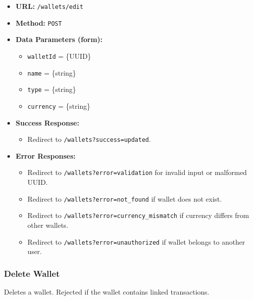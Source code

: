 \begin{itemize}
    \item \textbf{URL:} \texttt{/wallets/edit}
    \item \textbf{Method:} \texttt{POST}
    \item \textbf{Data Parameters (form):}
    \begin{itemize}
        \item \texttt{walletId} = \{UUID\}
        \item \texttt{name} = \{string\}
        \item \texttt{type} = \{string\}
        \item \texttt{currency} = \{string\}
    \end{itemize}
    \item \textbf{Success Response:}
    \begin{itemize}
        \item Redirect to \texttt{/wallets?success=updated}.
    \end{itemize}
    \item \textbf{Error Responses:}
    \begin{itemize}
        \item Redirect to \texttt{/wallets?error=validation} for invalid input or malformed UUID.
        \item Redirect to \texttt{/wallets?error=not\_found} if wallet does not exist.
        \item Redirect to \texttt{/wallets?error=currency\_mismatch} if currency differs from other wallets.
        \item Redirect to \texttt{/wallets?error=unauthorized} if wallet belongs to another user.
    \end{itemize}
\end{itemize}

\subsubsection{Delete Wallet}

Deletes a wallet. Rejected if the wallet contains linked transactions.

